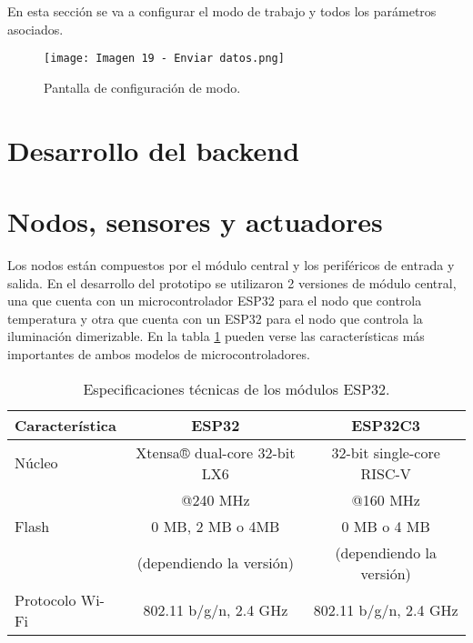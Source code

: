 En esta sección se va a configurar el modo de trabajo y todos los parámetros asociados.

\begin{figure}[h]
\centering
\texttt{[image: Imagen 19 - Enviar datos.png]}
\caption[Pantalla de configuración de modo]{Pantalla de configuración de modo. \footnotemark}
\label{fig:19}
\end{figure}

\section{Desarrollo del backend}



\section{Nodos, sensores y actuadores}

Los nodos están compuestos por el módulo central y los periféricos de entrada y salida. En el desarrollo del prototipo se utilizaron 2 versiones de módulo central, una que cuenta con un microcontrolador ESP32 para el nodo que controla temperatura y otra que cuenta con un ESP32 para el nodo que controla la iluminación dimerizable. En la tabla \ref{tab:esp32} pueden verse las características más importantes de ambos modelos de microcontroladores.

\begin{table}[h]
\centering
\caption[Módulos ESP32]{Especificaciones técnicas de los módulos ESP32.}
\begin{tabular}{l c c}
\toprule
\textbf{Característica} & \textbf{ESP32} & \textbf{ESP32C3}\\
\midrule
Núcleo			& Xtensa® dual-core 32-bit LX6 	& 32-bit single-core RISC-V \\
				& @240 MHz						& @160 MHz \\
Flash			& 0 MB, 2 MB o 4MB				& 0 MB o 4 MB \\
				& (dependiendo la versión)		& (dependiendo la versión) \\
Protocolo Wi-Fi	& 802.11 b/g/n, 2.4 GHz			& 802.11 b/g/n, 2.4 GHz \\
\bottomrule
\hline
\end{tabular}
\label{tab:esp32}
\end{table}


